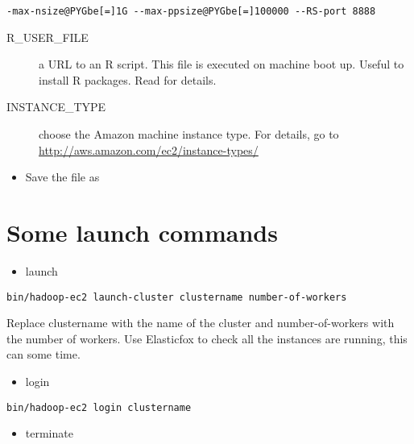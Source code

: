 \documentclass[letterpaper,10pt,english]{manual}
\begin{document}
\begin{Verbatim}[commandchars=@\[\]]
-max-nsize@PYGbe[=]1G --max-ppsize@PYGbe[=]100000 --RS-port 8888
\end{Verbatim}
\begin{description}
\item[R\_USER\_FILE]
a URL to an R script. This file is executed on machine boot up. Useful to install R packages. Read  for details.

\item[INSTANCE\_TYPE]
choose the Amazon machine instance type. For details, go to
\href{http://aws.amazon.com/ec2/instance-types/}{http://aws.amazon.com/ec2/instance-types/}

\end{description}
\begin{itemize}
\item {} 
Save the file as 

\end{itemize}


\section{Some launch commands}
\begin{itemize}
\item {} 
launch

\end{itemize}

\begin{Verbatim}[commandchars=@\[\]]
bin/hadoop-ec2 launch-cluster clustername number-of-workers
\end{Verbatim}

Replace clustername with the name of the cluster and number-of-workers with the number of workers. Use Elasticfox to check all the instances are running, this can some time.
\begin{itemize}
\item {} 
login

\end{itemize}

\begin{Verbatim}[commandchars=@\[\]]
bin/hadoop-ec2 login clustername
\end{Verbatim}
\begin{itemize}
\item {} 
terminate

\end{itemize}
\end{document}
